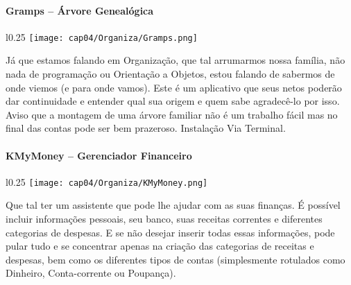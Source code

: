 \paragraph{Gramps – Árvore Genealógica}
\begin{minipage}{\linewidth}
 \vspace{5pt}
 \begin{wrapfigure}{l}{0.25\textwidth}
  \vspace{-\baselineskip}
  \texttt{[image: cap04/Organiza/Gramps.png]} 
 \end{wrapfigure}
 Já que estamos falando em Organização, que tal arrumarmos nossa família, não nada de programação ou Orientação a Objetos, estou falando de sabermos de onde viemos (e para onde vamos). Este é um aplicativo que seus netos poderão dar continuidade e entender qual sua origem e quem sabe agradecê-lo por isso. Aviso que a montagem de uma árvore familiar não é um trabalho fácil mas no final das contas pode ser bem prazeroso. Instalação Via Terminal.
\end{minipage}

\paragraph{KMyMoney – Gerenciador Financeiro}
\begin{minipage}{\linewidth}
 \vspace{5pt}
 \begin{wrapfigure}{l}{0.25\textwidth}
  \vspace{-\baselineskip}
  \texttt{[image: cap04/Organiza/KMyMoney.png]} 
 \end{wrapfigure}
 Que tal ter um assistente que pode lhe ajudar com as suas finanças. É possível incluir informações pessoais, seu banco, suas receitas correntes e diferentes categorias de despesas. E se não desejar inserir todas essas informações, pode pular tudo e se concentrar apenas na criação das categorias de receitas e despesas, bem como os diferentes tipos de contas (simplesmente rotulados como Dinheiro, Conta-corrente ou Poupança).
\end{minipage}

